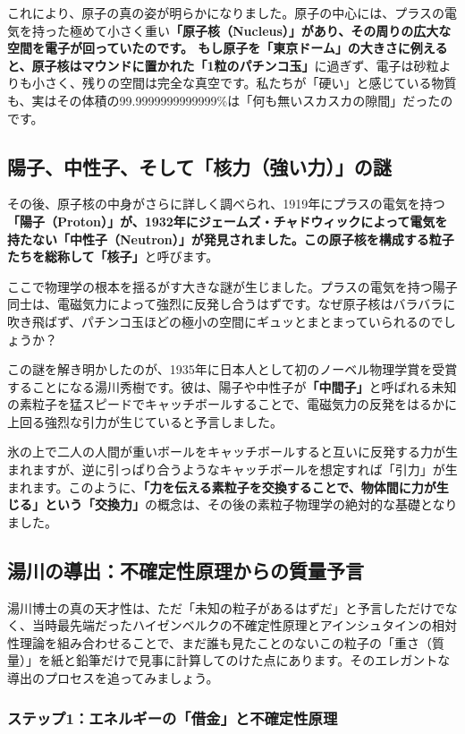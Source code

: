 これにより、原子の真の姿が明らかになりました。原子の中心には、プラスの電気を持った極めて小さく重い\textbf{「原子核（Nucleus）」があり、その周りの広大な空間を電子が回っていたのです。 もし原子を「東京ドーム」の大きさに例えると、原子核はマウンドに置かれた「1粒のパチンコ玉」}に過ぎず、電子は砂粒よりも小さく、残りの空間は完全な真空です。私たちが「硬い」と感じている物質も、実はその体積の99.9999999999999\%は「何も無いスカスカの隙間」だったのです。

\subsection{陽子、中性子、そして「核力（強い力）」の謎}

その後、原子核の中身がさらに詳しく調べられ、1919年にプラスの電気を持つ\textbf{「陽子（Proton）」が、1932年にジェームズ・チャドウィックによって電気を持たない「中性子（Neutron）」が発見されました。この原子核を構成する粒子たちを総称して「核子」}と呼びます。

ここで物理学の根本を揺るがす大きな謎が生じました。プラスの電気を持つ陽子同士は、電磁気力によって強烈に反発し合うはずです。なぜ原子核はバラバラに吹き飛ばず、パチンコ玉ほどの極小の空間にギュッとまとまっていられるのでしょうか？

この謎を解き明かしたのが、1935年に日本人として初のノーベル物理学賞を受賞することになる湯川秀樹です。彼は、陽子や中性子が\textbf{「中間子」}と呼ばれる未知の素粒子を猛スピードでキャッチボールすることで、電磁気力の反発をはるかに上回る強烈な引力が生じていると予言しました。

氷の上で二人の人間が重いボールをキャッチボールすると互いに反発する力が生まれますが、逆に引っぱり合うようなキャッチボールを想定すれば「引力」が生まれます。このように、\textbf{「力を伝える素粒子を交換することで、物体間に力が生じる」という「交換力」}の概念は、その後の素粒子物理学の絶対的な基礎となりました。

\subsection{湯川の導出：不確定性原理からの質量予言}

湯川博士の真の天才性は、ただ「未知の粒子があるはずだ」と予言しただけでなく、当時最先端だったハイゼンベルクの不確定性原理とアインシュタインの相対性理論を組み合わせることで、まだ誰も見たことのないこの粒子の「重さ（質量）」を紙と鉛筆だけで見事に計算してのけた点にあります。そのエレガントな導出のプロセスを追ってみましょう。

\subsubsection{ステップ1：エネルギーの「借金」と不確定性原理}

